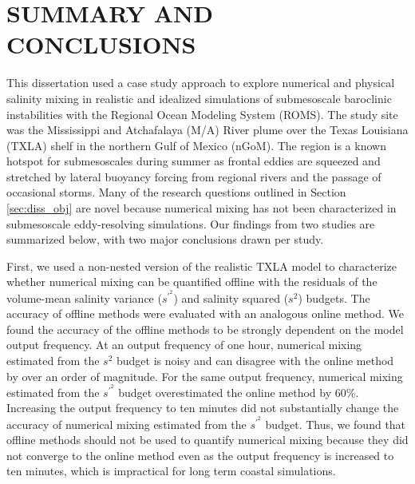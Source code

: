 

\chapter{SUMMARY AND CONCLUSIONS \label{cha:Summary}}
This dissertation used a case study approach to explore numerical and physical salinity mixing in realistic and idealized simulations of submesoscale baroclinic instabilities with the Regional Ocean Modeling System (ROMS). The study site was the Mississippi and Atchafalaya (M/A) River plume over the Texas Louisiana (TXLA) shelf in the northern Gulf of Mexico (nGoM). The region is a known hotspot for submesoscales during summer as frontal eddies are squeezed and stretched by lateral buoyancy forcing from regional rivers and the passage of occasional storms. Many of the research questions outlined in Section \ref{sec:diss_obj} are novel because numerical mixing has not been characterized in submesoscale eddy-resolving simulations. Our findings from two studies are summarized below, with two major conclusions drawn per study. 

First, we used a non-nested version of the realistic TXLA model to characterize whether numerical mixing can be quantified offline with the residuals of the volume-mean salinity variance ($s^{\prime^2}$) and salinity squared ($s^2$) budgets. The accuracy of offline methods were evaluated with an analogous online method. We found the accuracy of the offline methods to be strongly dependent on the model output frequency. At an output frequency of one hour, numerical mixing estimated from the $s^2$ budget is noisy and can disagree with the online method by over an order of magnitude. For the same output frequency, numerical mixing estimated from the $s^{\prime^2}$ budget overestimated the online method by 60\%. Increasing the output frequency to ten minutes did not substantially change the accuracy of numerical mixing estimated from the $s^{\prime^2}$ budget. Thus, we found that offline methods should not be used to quantify numerical mixing because they did not converge to the online method even as the output frequency is increased to ten minutes, which is impractical for long term coastal simulations. 

